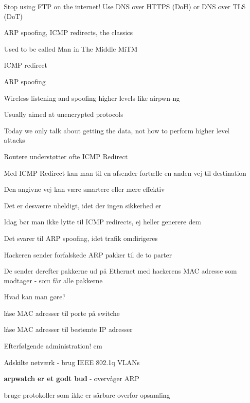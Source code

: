 \documentclass[Screen16to9,17pt]{foils}
\begin{document}
Stop using FTP on the internet! Use DNS over HTTPS (DoH) or DNS over TLS (DoT)


\begin{list1}
\item ARP spoofing, ICMP redirects, the classics
\item Used to be called Man in The Middle MiTM
\begin{list2}
\item ICMP redirect
\item ARP spoofing
\item Wireless listening and spoofing higher levels like  airpwn-ng 
\end{list2}
\item Usually aimed at unencrypted protocols
\item Today we only talk about getting the data, not how to perform higher level attacks
\end{list1}



\begin{list1}
\item Routere understøtter ofte ICMP Redirect
\item Med ICMP Redirect kan man til en afsender fortælle en anden vej til destination
\item Den angivne vej kan være smartere eller mere effektiv
\item Det er desværre uheldigt, idet der ingen sikkerhed er
\item Idag bør man ikke lytte til ICMP redirects, ej heller generere dem
\item Det svarer til ARP spoofing, idet trafik omdirigeres
\end{list1}




\begin{list1}
\item Hackeren sender forfalskede ARP pakker til de to parter
\item De sender derefter pakkerne ud på Ethernet med hackerens MAC
  adresse som modtager - som får alle pakkerne
\end{list1}


\begin{list1}
\item Hvad kan man gøre?
\item låse MAC adresser til porte på switche
\item låse MAC adresser til bestemte IP adresser
\item Efterfølgende administration!
 cm
\item Adskilte netværk - brug IEEE 802.1q VLANs
\item {\bfseries arpwatch er et godt bud} - overvåger ARP
\item bruge protokoller som ikke er sårbare overfor opsamling
\end{list1}
\end{document}
